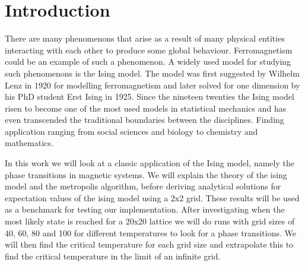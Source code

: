 \section{Introduction}
There are many phenomenons that arise as a result of many physical entities
interacting with each other to produce some global behaviour.
Ferromagnetism could be an example of such a phenomenon. A widely used model for
studying such phenomenons is the Ising model.
The model was first suggested by Wilhelm Lenz in 1920 for modelling ferromagnetism and later solved
for one dimension by his PhD student Erst Ising in 1925. Since the nineteen
twenties the Ising model risen to become one of the most used models in
statistical mechanics and has even
transcended the traditional boundaries between the disciplines. Finding
application ranging from social sciences and biology to chemistry and
mathematics.

In this work we will look at a classic application of the Ising model, namely
the phase transitions in magnetic systems.
We will explain the theory of the ising model and the metropolis algorithm,
before deriving analytical solutions for expectation values of the ising
model using a 2x2 grid. These results will be used as a benchmark for testing
our implementation. After investigating when the most likely state is reached
for a 20x20 lattice we will do runs with grid sizes of 40, 60, 80 and 100
for different temperatures to look for a phase transitions.
We will then find the critical temperature for each grid size and extrapolate
this to find the critical temperature in the limit of an infinite grid.


